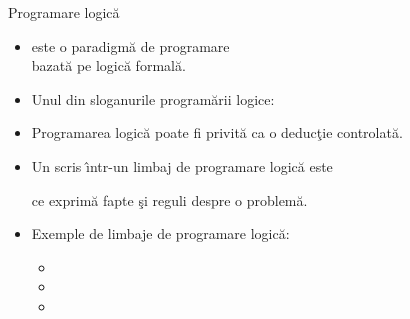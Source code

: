 \documentclass[xcolor=x11names,compress,10pt]{beamer}
\begin{document}
\begin{frame}{Programare logic\u a}


\begin{itemize}
	\item {} este o paradigm\u a de programare \\
	bazat\u a pe logic\u a formal\u a.
	
	\vspace{.2cm} \pause
	\item Unul din sloganurile program\u arii logice:
	\begin{center}
	\href{https://www.doc.ic.ac.uk/~rak/papers/History.pdf}{}  	
	\end{center} 
	
	\vspace{.2cm} \pause
	\item Programarea logic\u a poate fi privit\u a ca o deduc\c tie controlat\u a.	
	
	\vspace{.2cm} \pause
	\item Un  scris \^\i ntr-un limbaj de programare logic\u a este
	\begin{center}
	\end{center}
	ce exprim\u a fapte \c si reguli despre o problem\u a.

	\vspace{.2cm} \pause
	\item Exemple de limbaje de programare logic\u a: 
		\begin{itemize}
			\item {}
			\item {}
			\item {}
		\end{itemize}
\end{itemize}
\end{frame}


\end{document}
